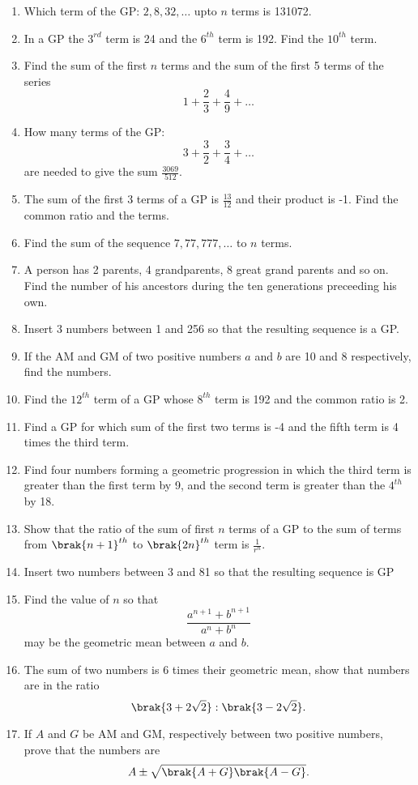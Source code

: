 \begin{enumerate}[label=\thesubsection.\arabic*.,ref=\thesubsection.\theenumi]
	\item Which term of the GP: $2, 8, 32, \dots $ upto $n$ terms is 131072.
	\item In a GP the $3^{rd}$ term is 24 and the $6^{th}$ term is 192.  Find the $10^{th}$ term.
	\item Find the sum of the first $n$ terms and the sum of the first 5 terms of the series 
		$$ 1 + \frac{2}{3}+\frac{4}{9}+\dots$$
	\item How many terms of the GP: 
		$$ 3 + \frac{3}{2}+\frac{3}{4}+\dots$$
		are needed to give the sum $\frac{3069}{512}$.
	\item The sum of the first 3 terms of a GP is 
$\frac{13}{12}$ and their product is -1.  Find the common ratio and the terms.
\item Find the sum of the sequence $7, 77, 777, \dots$ to $n$ terms.
\item A person has 2 parents, 4 grandparents, 8 great grand parents and so on.  Find the number of his ancestors during the ten generations preceeding his own.
\item Insert 3 numbers between 1 and 256 so that the resulting sequence is a GP.
\item If the AM and GM of two positive numbers $a$ and $b$ are 10 and 8 respectively, find the numbers.
\item Find the $12^{th}$ term of a GP  whose $8^{th}$ term is 192 and the common ratio is 2.
\item Find a GP  for which sum of the first two terms is -4 and the fifth term is 4 times the third term.
\item Find four numbers forming a geometric progression in which the third term is greater than the first term by 9, and the second term is greater than the $4^{th}$ by 18.
\item Show that the ratio of the sum of first $n$ terms of a GP  to the sum of terms from $\brak{n+1}^{th}$ to $\brak{2n}^{th}$ term is $\frac{1}{r^n}$.
\item Insert two numbers between 3 and 81 so that the resulting sequence is GP 
\item Find the value of $n$ so that $$\frac{a^{n + 1} + b^{n + 1}}{a^n + b^n}$$ may be the geometric mean between $a$ and $b$.
\item The sum of two numbers is 6 times their geometric mean, show that numbers are in the ratio $$\brak{3+2\sqrt{2}}:\brak{3-2\sqrt{2}}.$$
\item If $A$ and $G$ be AM  and GM, respectively between two positive numbers, prove that the numbers are $$A \pm \sqrt{\brak{A+G}\brak{A-G}}.$$

\end{enumerate}
